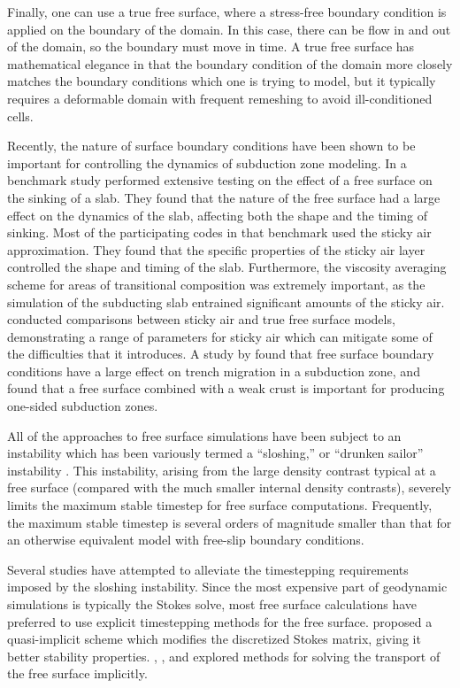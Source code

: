 \documentclass[preprint,12pt,authoryear]{elsarticle}
\begin{document}
Finally, one can use a true free surface, where a stress-free boundary condition is applied on the boundary 
of the domain. In this case, there can be flow in and out of the domain, so the boundary must move in time.
A true free surface has mathematical elegance in that the boundary condition of the domain more closely 
matches the boundary conditions which one is trying to model, but it typically requires a deformable 
domain with frequent remeshing to avoid ill-conditioned cells. 

Recently, the nature of surface boundary conditions have been shown to be important for controlling the 
dynamics of subduction zone modeling.  In a benchmark study \citet{schmeling2008benchmark} performed extensive testing on the effect
of a free surface on the sinking of a slab. They found that the nature of the free surface had a large effect 
on the dynamics of the slab, affecting both the shape and the timing of sinking. Most of the 
participating codes in that benchmark used the sticky air approximation.
They found that the specific properties of the sticky air layer controlled the shape and timing of the slab.
Furthermore, the viscosity averaging scheme for areas of transitional
composition was extremely important, as the simulation of the subducting slab entrained significant amounts of the sticky air.
\citet{crameri2012comparison} conducted comparisons between sticky air and true free surface models, 
demonstrating a range of parameters for sticky air which can mitigate some of the difficulties that it introduces.
A study by \citet{quinquis2011role} found that free surface boundary conditions have a large effect on 
trench migration in a subduction zone, and \citet{crameri2012free} found that a free surface combined 
with a weak crust is important for producing one-sided subduction zones.

All of the approaches to free surface simulations have been subject to an instability which has been 
variously termed a ``sloshing,'' or ``drunken sailor'' instability \citep{kaus2010stabilization, duretz2011discretization, kramer2012implicit}. 
This instability, arising from the large density contrast typical at a free surface (compared with the much smaller 
internal density contrasts), severely limits the maximum stable timestep for free surface computations.
Frequently, the maximum stable timestep is several orders of magnitude smaller than that for an otherwise 
equivalent model with free-slip boundary conditions.

Several studies have attempted to alleviate the timestepping requirements imposed by the sloshing 
instability. Since the most expensive part of geodynamic simulations is typically the Stokes solve,
most free surface calculations have preferred to use explicit timestepping methods for the free 
surface. \citet{kaus2010stabilization} proposed a quasi-implicit scheme which modifies the discretized 
Stokes matrix, giving it better stability properties.  \citet{popov2008slim3d}, \citet{kramer2012implicit}, and \citet{furuichi2015implicit}
explored methods for solving the transport of the free surface implicitly.
\end{document}
